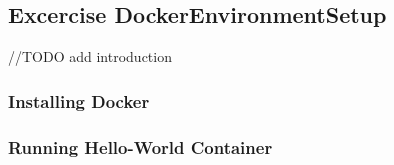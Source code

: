 \subsection{Excercise DockerEnvironmentSetup}
//TODO add introduction
\subsubsection*{Installing Docker}

\subsubsection*{Running Hello-World Container}